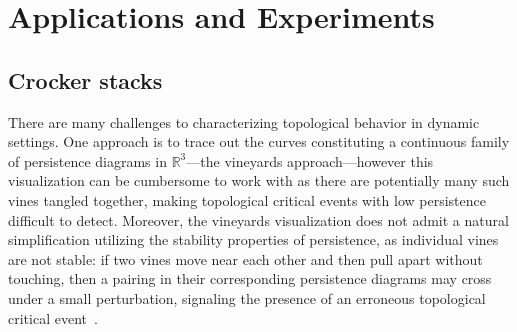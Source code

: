 \documentclass[sn-mathphys]{sn-jnl}
\begin{document}


\section{Applications and Experiments}\label{sec:results}
\subsection*{Crocker stacks}
There are many challenges to characterizing topological behavior in dynamic settings. One approach is to trace out the curves constituting a continuous family of persistence diagrams in $\mathbb{R}^3$---the vineyards approach---however this visualization can be cumbersome to work with as there are potentially many such vines tangled together, making topological critical events with low persistence difficult to detect. Moreover, the vineyards visualization does not admit a natural simplification utilizing the stability properties of persistence, as individual vines are not stable: if two vines move near each other and then pull apart without touching, then a pairing in their corresponding persistence diagrams may cross under a small perturbation, signaling the presence of an erroneous topological critical event~\cite{topaz2015topological, xian2020capturing}. 
\end{document}
